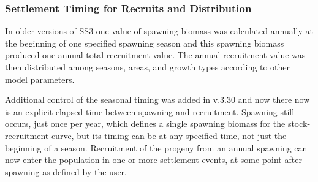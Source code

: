 \subsubsection{Settlement Timing for Recruits and Distribution}
In older versions of SS3 one value of spawning biomass was calculated annually at the beginning of one specified spawning season and this spawning biomass produced one annual total recruitment value. The annual recruitment value was then distributed among seasons, areas, and growth types according to other model parameters.

Additional control of the seasonal timing was added in v.3.30 and now there now is an explicit elapsed time between spawning and recruitment. Spawning still occurs, just once per year, which defines a single spawning biomass for the stock-recruitment curve, but its timing can be at any specified time, not just the beginning of a season. Recruitment of the progeny from an annual spawning can now enter the population in one or more settlement events, at some point after spawning as defined by the user.

